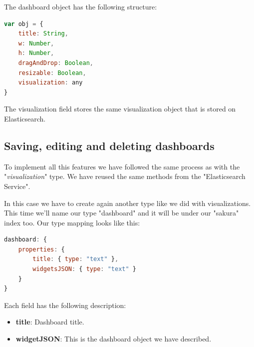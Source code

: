 \documentclass[a4paper, 12pt, english]{book}
\begin{document}
The dashboard object has the following structure:
\begin{lstlisting}[language=javascript, caption=Dashboard object structure, label=code:dashboard-object]
var obj = {
    title: String,
    w: Number,
    h: Number,
    dragAndDrop: Boolean,
    resizable: Boolean,
    visualization: any
}
\end{lstlisting}

The visualization field stores the same visualization object that is stored on Elasticsearch.

\subsection{Saving, editing and deleting dashboards}
\label{sec:visualizations-dashboard}
To implement all this features we have followed the same process as with the "\textit{visualization}" type. We have reused the same methods from the "Elasticsearch Service".

In this case we have to create again another type like we did with visualizations. This time we'll name our type "dashboard" and it will be under our "sakura" index too. Our type mapping looks like this:
\begin{lstlisting}[language=javascript, caption=Elasticsearch "dashboard" type mapping, label=code:dashboard-type-mapping]
dashboard: {
    properties: {
        title: { type: "text" },
        widgetsJSON: { type: "text" }
    }
}
\end{lstlisting}

Each field has the following description:
\begin{itemize}
    \item \textbf{title}: Dashboard title.
    \item \textbf{widgetJSON}: This is the dashboard object we have described.
\end{itemize}




\end{document}
